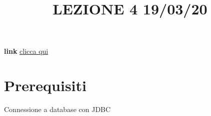 \title{LEZIONE 4 19/03/20}\newline
\textbf{link} \href{https://web.microsoftstream.com/video/53d9a40e-3109-44fc-8195-0553eedfb6d9}{clicca qui}
\section*{Prerequisiti}
Connessione a database con JDBC
\section{}